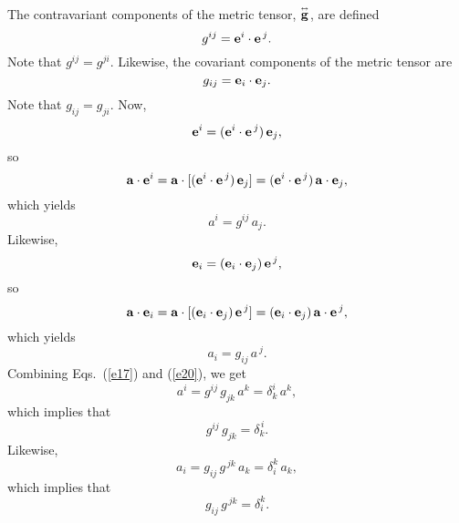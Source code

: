 \documentclass[12pt,prb,aps,notitlepage]{revtex4-1}
\newcommand{\smalltensor}[1]{\overset{\text{\tiny$\leftrightarrow$}}{#1}}
\begin{document}
 The contravariant components of the metric tensor, $\smalltensor{\bf g}$, are defined
 \begin{equation}
 g^{ij} = {\bf e}^i\cdot{\bf e}^{\,j}.
 \end{equation}
 Note that $g^{ij}=g^{ji}$. 
 Likewise, the covariant components of the metric tensor are  
 \begin{equation}
 g_{ij} = {\bf e}_i\cdot{\bf e}_j.
 \end{equation}
 Note that $g_{ij}= g_{ji}$. 
 Now, 
 \begin{equation}
 {\bf e}^i = ({\bf e}^i\cdot{\bf e}^{\,j})\,{\bf e}_j,
 \end{equation}
so
\begin{equation}
{\bf a}\cdot{\bf e}^i = {\bf a}\cdot[ ({\bf e}^i\cdot{\bf e}^{\,j})\,{\bf e}_j]=( {\bf e}^i\cdot{\bf e}^{\,j})\,{\bf a}\cdot{\bf e}_j,
\end{equation}
which yields
\begin{equation}\label{e17}
a^i = g^{ij}\,a_j.
\end{equation}
Likewise, 
\begin{equation}
 {\bf e}_i = ({\bf e}_i\cdot{\bf e}_j)\,{\bf e}^{\,j},
 \end{equation}
so 
\begin{equation}
{\bf a}\cdot{\bf e}_i = {\bf a}\cdot[ ({\bf e}_i\cdot{\bf e}_j)\,{\bf e}^{\,j}]= ({\bf e}_i\cdot{\bf e}_j)\,{\bf a}\cdot{\bf e}^{\,j},
\end{equation}
which yields
\begin{equation}\label{e20}
a_i = g_{ij}\,a^{\,j}.
\end{equation}
Combining Eqs.~(\ref{e17}) and (\ref{e20}), we get
\begin{equation}
a^i = g^{ij}\,g_{jk}\,a^k = \delta^{i}_k\,a^k,
\end{equation}
which implies that
\begin{equation}
g^{ij}\,g_{jk}= \delta^{\,i}_k.
\end{equation}
Likewise, 
\begin{equation}
a_i = g_{ij}\,g^{\,jk}\,a_k = \delta_{i}^k\,a_k,
\end{equation}
which implies that
\begin{equation}
g_{ij}\,g^{\,jk}= \delta_{i}^k.
\end{equation}
\end{document}
